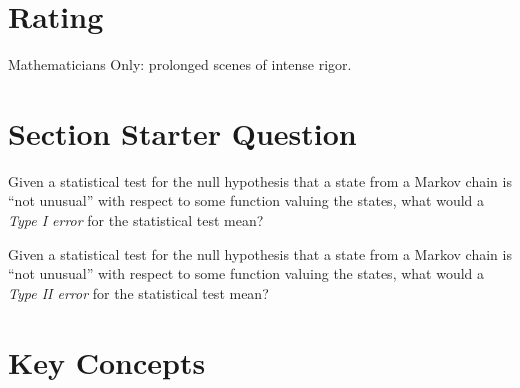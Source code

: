 \documentclass[12pt]{article}
\begin{document}
\myheader \mytitle

\hr


\hr

\usefirefox

\hr



\section*{Rating} %
Mathematicians Only:  prolonged scenes of intense rigor.

\hr

\section*{Section Starter Question}

Given a statistical test for the null hypothesis that a state from a
Markov chain is ``not unusual'' with respect to some function valuing
the states, what would a \emph{Type I error} for the statistical test
mean?

Given a statistical test for the null hypothesis that a state from a
Markov chain is ``not unusual'' with respect to some function valuing
the states, what would a \emph{Type II error} for the statistical test
mean?

\hr

\section*{Key Concepts}
\end{document}
